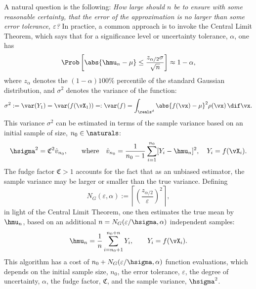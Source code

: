 \documentclass[12pt]{amsart}
\newcommand{\hv}{\hat{v}}
\newcommand{\fudge}{\mathfrak{C}}
\begin{document}
A natural question is the following: \emph{How large should $n$ be to ensure with some reasonable certainty, that the error of the approximation is no larger than some error tolerance, $\varepsilon$?}  In practice, a common approach is to invoke the Central Limit Theorem, which says that for a significance level or uncertainty tolerance, $\alpha$, one has
\begin{equation} \label{CLT}
\Prob\left[\abs{\hmu_n-\mu} \le \frac{z_{\alpha/2} \sigma}{\sqrt{n}} \right] \approx 1-\alpha,
\end{equation}
where $z_\alpha$ denotes the $(1-\alpha)100\%$ percentile of the standard Gaussian distribution, and $\sigma^2$ denotes the variance of the function:
\begin{equation} \label{sigmadef}
\sigma^2 := \var(Y_1) = \var(f(\vX_1)) =: \var(f) = \int_{\reals^d} \abs{f(\vx)-\mu}^2 \rho(\vx) \, \dif \vx.
\end{equation}
This variance $\sigma^2$ can be estimated in terms of the sample variance based on an initial  sample of size, $n_0 \in \naturals$:
\begin{equation} \label{samplevar}
\hsigma^2 = \fudge^2 \hv_{n_0}, \qquad \text{where} \quad \hv_{n_0} = \frac 1{n_0-1} \sum_{i=1}^{n_0} [Y_i- \hmu_{n}]^2, \quad Y_i=f(\vX_i).
\end{equation}
The fudge factor $\fudge>1$ accounts for the fact that as an unbiased estimator, the sample variance may be larger or smaller than the true variance.  Defining 
\begin{equation} \label{CLTsample}
N_{G}(\varepsilon,\alpha) :=\left \lceil \left(\frac{z_{\alpha/2}}{\varepsilon}\right)^2 \right \rceil, 
\end{equation}
in light of the Central Limit Theorem, one then estimates the true mean by $\hmu_{n}$, based on an additional $n=N_{G}(\varepsilon/\hsigma,\alpha)$ independent samples:
\begin{equation} \label{simpleMCest}
\hmu_n = \frac 1n \sum_{i=n_0+1}^{n_0+n} Y_i, \qquad Y_i = f(\vX_i).
\end{equation}
This algorithm has a cost of $n_0+N_{G}(\varepsilon/\hsigma,\alpha)$ function evaluations, which depends on the initial sample size, $n_0$, the error tolerance, $\varepsilon$, the degree of uncertainty, $\alpha$, the fudge factor, $\fudge$, and the sample variance, $\hsigma^2$.
\end{document}
